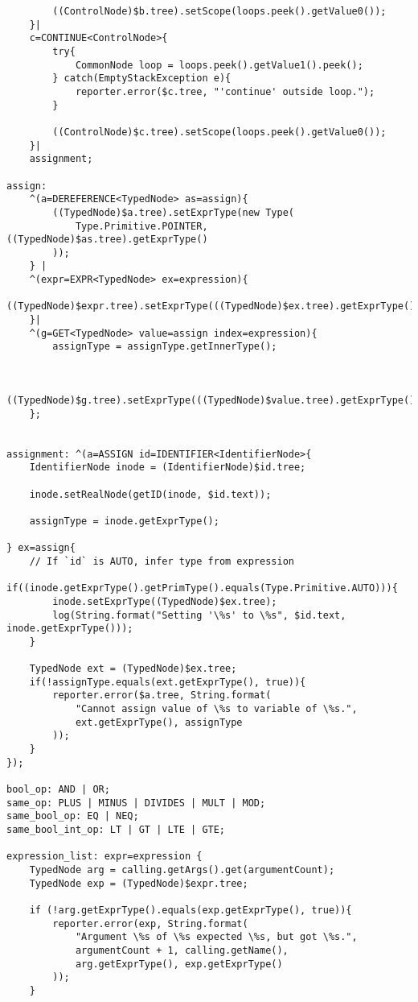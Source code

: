 \begin{landscape}
\begin{lstlisting}
        ((ControlNode)$b.tree).setScope(loops.peek().getValue0());
    }|
    c=CONTINUE<ControlNode>{
        try{
            CommonNode loop = loops.peek().getValue1().peek();
        } catch(EmptyStackException e){
            reporter.error($c.tree, "'continue' outside loop.");
        }

        ((ControlNode)$c.tree).setScope(loops.peek().getValue0());
    }|
    assignment;

assign:
    ^(a=DEREFERENCE<TypedNode> as=assign){
        ((TypedNode)$a.tree).setExprType(new Type(
            Type.Primitive.POINTER, ((TypedNode)$as.tree).getExprType()
        ));
    } |
    ^(expr=EXPR<TypedNode> ex=expression){
        ((TypedNode)$expr.tree).setExprType(((TypedNode)$ex.tree).getExprType());
    }|
    ^(g=GET<TypedNode> value=assign index=expression){
        assignType = assignType.getInnerType();


        ((TypedNode)$g.tree).setExprType(((TypedNode)$value.tree).getExprType());
    };


assignment: ^(a=ASSIGN id=IDENTIFIER<IdentifierNode>{
    IdentifierNode inode = (IdentifierNode)$id.tree;

    inode.setRealNode(getID(inode, $id.text));

    assignType = inode.getExprType();

} ex=assign{
    // If `id` is AUTO, infer type from expression
    if((inode.getExprType().getPrimType().equals(Type.Primitive.AUTO))){
        inode.setExprType((TypedNode)$ex.tree);
        log(String.format("Setting '\%s' to \%s", $id.text, inode.getExprType()));
    } 

    TypedNode ext = (TypedNode)$ex.tree;
    if(!assignType.equals(ext.getExprType(), true)){
        reporter.error($a.tree, String.format(
            "Cannot assign value of \%s to variable of \%s.",
            ext.getExprType(), assignType
        ));
    }
});

bool_op: AND | OR;
same_op: PLUS | MINUS | DIVIDES | MULT | MOD;
same_bool_op: EQ | NEQ;
same_bool_int_op: LT | GT | LTE | GTE;

expression_list: expr=expression {
    TypedNode arg = calling.getArgs().get(argumentCount);
    TypedNode exp = (TypedNode)$expr.tree;

    if (!arg.getExprType().equals(exp.getExprType(), true)){
        reporter.error(exp, String.format(
            "Argument \%s of \%s expected \%s, but got \%s.",
            argumentCount + 1, calling.getName(),
            arg.getExprType(), exp.getExprType()
        ));
    }


\end{lstlisting}
\end{landscape}
